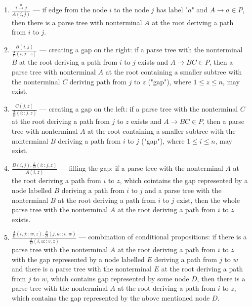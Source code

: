 \begin{enumerate}
\item $\frac{i \xrightarrow{a} j}{A(i , j)}$  --- if edge from the node $i$ to the node $j$ has label "$a$" and $A \rightarrow a \in P$, then there is a parse tree with nonterminal $A$ at the root deriving a path from $i$ to $j$.
\\
\item $\frac{B(i , j)}{\frac{A}{C}(i , j :: z)}$ --- creating a gap on the right: if a parse tree with the nonterminal $B$ at the root deriving a path from $i$ to $j$ exists and $A \rightarrow BC \in P$, then a parse tree with nonterminal $A$ at the root containing a smaller subtree with the nonterminal $C$ deriving path from $j$ to $z$ ("gap"), where $1 \le z \le n$, may exist.
\\
\item $\frac{C(j  , z)}{\frac{A}{B}(i :: j  , z)}$ --- creating a gap on the left: if a parse tree with the nonterminal $C$ at the root deriving a path from $j$ to $z$ exists and $A \rightarrow BC \in P$,  then a parse tree with nonterminal $A$ at the root containing a smaller subtree with the nonterminal $B$ deriving a path from $i$ to $j$ ("gap"), where $1 \le i \le n$, may exist.
\\
\item  $\frac{B(i, j), \frac{A}{B}(i :: j  , z)}{A(i, z)}$ --- filling the gap: if a parse tree with the nonterminal $A$ at the root deriving a path from $i$ to $z$, which cointains the gap represented by a node labelled $B$ deriving a path from $i$ to $j$ and a parse tree with the nonterminal $B$ at the root deriving a path from $i$ to $j$ exist, then the whole parse tree with the nonterminal $A$ at the root deriving a path from $i$ to $z$ exists.
\\
\item $\frac{\frac{A}{E}(i , j :: w, z), \frac{E}{D}( j , u :: v , w)}{\frac{A}{D}(i, u :: v , z)}$ --- combination of conditional propositions: if there is a parse tree with the nonterminal $A$ at the root deriving a path from $i$ to $z$ with the gap represented by a node labelled $E$ deriving a path from $j$ to $w$ and there is a parse tree with the nonterminal $E$ at the root deriving a path from $j$ to $w$, which contains gap represented by some node $D$, then there is a parse tree with the nonterminal $A$ at the root deriving a path from $i$ to $z$, which contains the gap represented by the above mentioned node $D$.
\end{enumerate}



